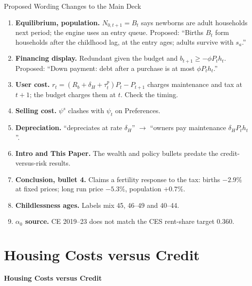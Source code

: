 \begin{frame}[t]{Proposed Wording Changes to the Main Deck}
\scriptsize
\begin{enumerate}\setlength\itemsep{1pt}
  \item \textbf{Equilibrium, population.} $N_{0,t+1}=B_t$ says newborns are adult households next period; the engine uses an entry queue.
  Proposed: ``Births $B_t$ form households after the childhood lag, at the entry ages; adults survive with $s_a$.''
  \item \textbf{Financing display.} Redundant given the budget and $b_{t+1}\ge-\phi P_th_t$. Proposed: ``Down payment: debt after a purchase is at most $\phi P_th_t$.''
  \item \textbf{User cost.} $r_t=(R_b+\delta_H+\tau^p_t)P_t-P_{t+1}$ charges maintenance and tax at $t+1$; the budget charges them at $t$. Check the timing.
  \item \textbf{Selling cost.} $\psi^s$ clashes with $\psi_t$ on Preferences.
  \item \textbf{Depreciation.} ``depreciates at rate $\delta_H$'' $\to$ ``owners pay maintenance $\delta_HP_th_t$''.
  \item \textbf{Intro and This Paper.} The wealth and policy bullets predate the credit-versus-risk results.
  \item \textbf{Conclusion, bullet 4.} Claims a fertility response to the tax: births $-2.9\%$ at fixed prices; long run price $-5.3\%$, population $+0.7\%$.
  \item \textbf{Childlessness ages.} Labels mix 45, 46--49 and 40--44.
  \item \textbf{$\alpha_0$ source.} CE 2019--23 does not match the CES rent-share target 0.360.
\end{enumerate}
\end{frame}

\section{Housing Costs versus Credit}
\begin{frame}{}
\centering
{\Large\textbf{Housing Costs versus Credit}}
\end{frame}


